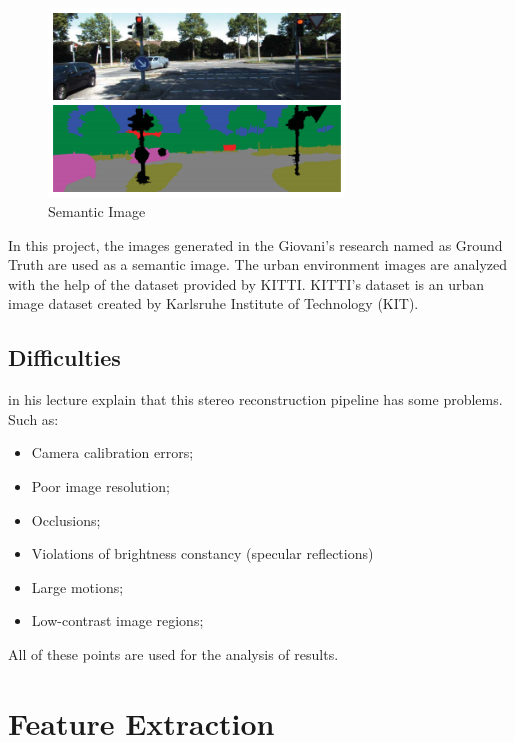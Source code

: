     \begin{figure}[H]
     \caption{\label{fig:semantic01}
Semantic Image}
     \begin{center}
        \includegraphics[width=0.7\textwidth]{images/semantic01.png}
     \end{center}
    \end{figure}    
    
    In this project, the images generated in the Giovani's research \cite{giovaniThesis} named as Ground Truth are used as a semantic image. The urban environment images are analyzed with the help of the dataset provided by KITTI. KITTI's dataset is an urban image dataset created by Karlsruhe Institute of Technology (KIT).

\subsection{Difficulties}

    \cite{SSD_teste} in his lecture explain that this stereo reconstruction pipeline has some problems. Such as:
    
    \begin{itemize}
    \item Camera calibration errors;
    \item Poor image resolution;
    \item Occlusions;
    \item Violations of brightness constancy (specular reflections)
    \item  Large motions;
    \item Low-contrast image regions;
\end{itemize}

    All of these points are used for the analysis of results.
    
\section{Feature Extraction}

